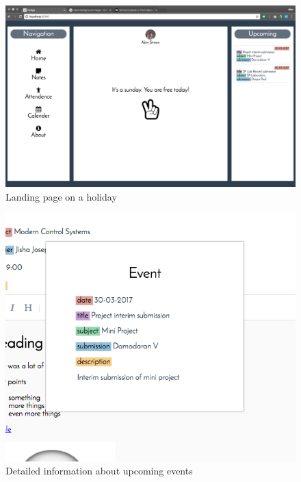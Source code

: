 \begin{figure}[htb]
    \centering
    \includegraphics[width=\linewidth]{holiday.png}
    \caption{Landing page on a holiday}
    \label{fig:holiday} %
\end{figure}

\begin{figure}[htb]
    \centering
    \includegraphics[width=\linewidth]{eventinfo.png}
    \caption{Detailed information about upcoming events}
    \label{fig:eventinfo} %
\end{figure}

